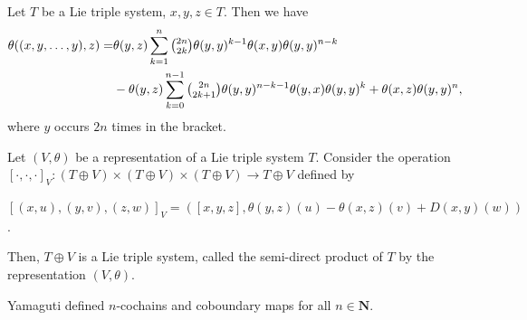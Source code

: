 \documentclass[11pt, twoside]{article}
\begin{document}
\begin{prop}\label{p5.16}\cite{BM26}
    Let $T$ be a Lie triple system, $x,y,z\in T $. Then we have \begin{align*}
        \theta((x,y,\dots,y),z)= &\theta(y,z)\sum\limits_{k=1}^n \tbinom{2n}{2k}\theta(y,y)^{k-1}\theta(x,y)\theta(y,y)^{n-k} \\ &- \theta(y,z)\sum\limits_{k=0}^{n-1}\tbinom{2n}{2k+1}\theta(y,y)^{n-k-1}\theta(y,x)\theta(y,y)^k + \theta(x,z)\theta(y,y)^n ,
    \end{align*} where $y$ occurs $2n$ times in the bracket.
\end{prop}

\begin{prop}
    Let $(V,\theta)$ be a representation of a Lie triple system $T$. Consider the operation $[\cdot,\cdot,\cdot]_V: (T\oplus V)\times (T\oplus V)\times (T\oplus V)\to T\oplus V  $ defined by \begin{center}
        $[(x,u),(y,v),(z,w)]_V=([x,y,z], \theta(y,z)(u)-\theta(x,z)(v)+ D(x,y)(w)) $.
    \end{center} Then, $T\oplus V$ is a Lie triple system, called the semi-direct product of $T$ by the representation $(V,\theta)$.
\end{prop}

Yamaguti defined $n$-cochains and coboundary maps for all $n\in \mathbf{N}$.
\end{document}
